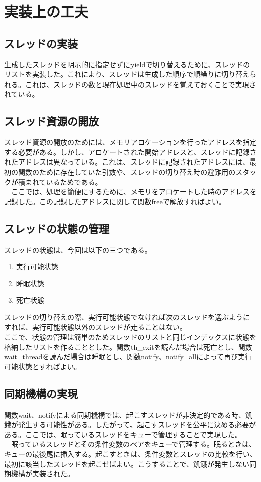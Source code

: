 \documentclass[11pt,a4paper]{jsarticle}
\begin{document}
\begin{screen}
\begin{verbatim}
\end{verbatim}
\end{screen}

\section{実装上の工夫}
\subsection{スレッドの実装}
生成したスレッドを明示的に指定せずにyieldで切り替えるために、スレッドのリストを実装した。これにより、スレッドは生成した順序で順繰りに切り替えられる。これは、スレッドの数と現在処理中のスレッドを覚えておくことで実現されている。\\
\subsection{スレッド資源の開放}
スレッド資源の開放のためには、メモリアロケーションを行ったアドレスを指定する必要がある。しかし、アロケートされた開始アドレスと、スレッドに記録されたアドレスは異なっている。これは、スレッドに記録されたアドレスには、最初の関数のために存在していた引数や、スレッドの切り替え時の避難用のスタックが積まれているためである。\\
　ここでは、処理を簡便にするために、メモリをアロケートした時のアドレスを記録した。この記録したアドレスに関して関数freeで解放すればよい。
\subsection{スレッドの状態の管理}
スレッドの状態は、今回は以下の三つである。
\begin{enumerate}
	\item 実行可能状態
	\item 睡眠状態
	\item 死亡状態
\end{enumerate}
スレッドの切り替えの際、実行可能状態でなければ次のスレッドを選ぶようにすれば、実行可能状態以外のスレッドが走ることはない。\\
ここで、状態の管理は簡単のためスレッドのリストと同じインデックスに状態を格納したリストを作ることとした。関数th\_exitを読んだ場合は死亡とし、関数wait\_threadを読んだ場合は睡眠とし、関数notify、notify\_allによって再び実行可能状態とすればよい。
\subsection{同期機構の実現}
関数wait、notifyによる同期機構では、起こすスレッドが非決定的である時、飢餓が発生する可能性がある。したがって、起こすスレッドを公平に決める必要がある。ここでは、眠っているスレッドをキューで管理することで実現した。\\
　眠っているスレッドとその条件変数のペアをキューで管理する。眠るときは、キューの最後尾に挿入する。起こすときは、条件変数とスレッドの比較を行い、最初に該当したスレッドを起こせばよい。こうすることで、飢餓が発生しない同期機構が実装された。\\





%
%
\end{document}
